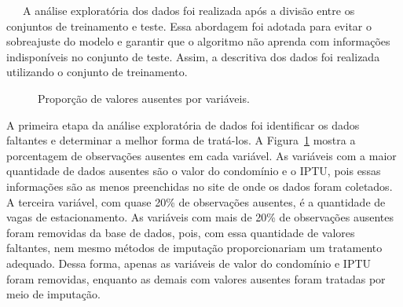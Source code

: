 \documentclass[
  12pt,
  a4paper,
]{scrreprt}
\begin{document}
~~~A análise exploratória dos dados foi realizada após a divisão entre
os conjuntos de treinamento e teste. Essa abordagem foi adotada para
evitar o sobreajuste do modelo e garantir que o algoritmo não aprenda
com informações indisponíveis no conjunto de teste. Assim, a descritiva
dos dados foi realizada utilizando o conjunto de treinamento.

\begin{figure}


\caption{\label{fig-miss}Proporção de valores ausentes por variáveis.}

\end{figure}%

A primeira etapa da análise exploratória de dados foi identificar os
dados faltantes e determinar a melhor forma de tratá-los. A
Figura~\ref{fig-miss} mostra a porcentagem de observações ausentes em
cada variável. As variáveis com a maior quantidade de dados ausentes são
o valor do condomínio e o IPTU, pois essas informações são as menos
preenchidas no site de onde os dados foram coletados. A terceira
variável, com quase 20\% de observações ausentes, é a quantidade de
vagas de estacionamento. As variáveis com mais de 20\% de observações
ausentes foram removidas da base de dados, pois, com essa quantidade de
valores faltantes, nem mesmo métodos de imputação proporcionariam um
tratamento adequado. Dessa forma, apenas as variáveis de valor do
condomínio e IPTU foram removidas, enquanto as demais com valores
ausentes foram tratadas por meio de imputação.
\end{document}
